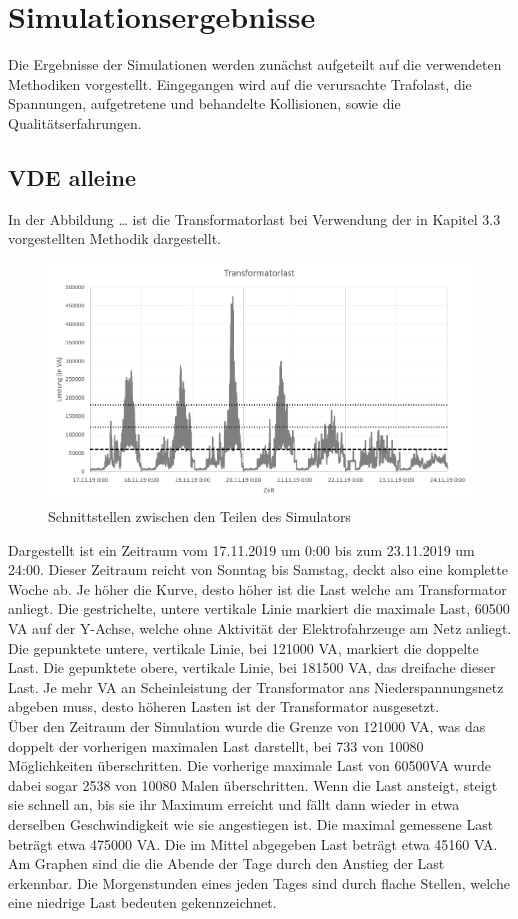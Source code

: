 \section{Simulationsergebnisse}
Die Ergebnisse der Simulationen werden zunächst aufgeteilt auf die verwendeten Methodiken vorgestellt. Eingegangen wird auf die verursachte Trafolast, die Spannungen, aufgetretene und behandelte Kollisionen, sowie die Qualitätserfahrungen.
\subsection{VDE alleine}
In der Abbildung … ist die Transformatorlast bei Verwendung der in Kapitel 3.3 vorgestellten Methodik dargestellt.\\
\begin{figure}[htb]
\centering
	\includegraphics[width=\textwidth]{img/VDE_tau/TrafoLast.png}
	\caption{Schnittstellen zwischen den Teilen des Simulators}
	\label{Abb_VDEtauTrafoLast}
\end{figure}
Dargestellt ist ein Zeitraum vom 17.11.2019 um 0:00 bis zum 23.11.2019 um 24:00. Dieser Zeitraum reicht von Sonntag bis Samstag, deckt also eine komplette Woche ab. Je höher die Kurve, desto höher ist die Last welche am Transformator anliegt. Die gestrichelte, untere vertikale Linie markiert die maximale Last, 60500 VA auf der Y-Achse, welche ohne Aktivität der Elektrofahrzeuge am Netz anliegt. Die gepunktete untere, vertikale Linie, bei 121000 VA, markiert die doppelte Last. Die gepunktete obere, vertikale Linie, bei 181500 VA, das dreifache dieser Last. Je mehr VA an Scheinleistung der Transformator ans Niederspannungsnetz abgeben muss, desto höheren Lasten ist der Transformator ausgesetzt. \\
Über den Zeitraum der Simulation wurde die Grenze von 121000 VA, was das doppelt der vorherigen maximalen Last darstellt, bei 733 von 10080 Möglichkeiten überschritten. Die vorherige maximale Last von 60500VA wurde dabei sogar 2538 von 10080 Malen überschritten. Wenn die Last ansteigt, steigt sie schnell an, bis sie ihr Maximum erreicht und fällt dann wieder in etwa derselben Geschwindigkeit wie sie angestiegen ist. Die maximal gemessene Last beträgt etwa 475000 VA. Die im Mittel abgegeben Last beträgt etwa 45160 VA. Am Graphen sind die die Abende der Tage durch den Anstieg der Last erkennbar. Die Morgenstunden eines jeden Tages sind durch flache Stellen, welche eine niedrige Last bedeuten gekennzeichnet. \\

